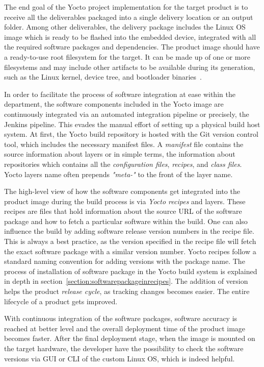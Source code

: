 The end goal of the Yocto project implementation for the target product is to receive all the deliverables packaged into a single delivery location or an output folder. Among other deliverables, the delivery package  includes the Linux \ac{OS} image which is ready to be flashed into the embedded device, integrated with all the required software packages and dependencies. The product image should have a ready-to-use root filesystem for the target. It can be made up of one or more filesystems and may include other artifacts to be available during its generation, such as the Linux kernel, device tree, and bootloader binaries~\parencite{salvador2014embedded}. 

In order to facilitate the process of software integration at ease within the department, the software components included in the Yocto image are continuously integrated via an automated integration pipeline or precisely, the Jenkins pipeline. This evades the manual effort of setting up a physical build host system. At first, the Yocto build repository is hosted with the Git version control tool, which includes the necessary manifest files. A \emph{manifest} file contains the source information about layers or in simple terms, the information about repositories which contains all the \emph{configuration files}, \emph{recipes}, and \emph{class files}. Yocto layers name often prepends \emph{"meta-"} to the front of the layer name.

The high-level view of how the software components get integrated into the product image during the build process is via \emph{Yocto recipes} and layers. These recipes are files that hold information about the source \ac{URL} of the software package and how to fetch a particular software within the build. One can also influence the build by adding software release version numbers in the recipe file. This is always a best practice, as the version specified in the recipe file will fetch the exact software package with a similar version number. Yocto recipes follow a standard naming convention for adding versions with the package name. The process of installation of software package in the Yocto build system is explained in depth in section~\ref{section:softwarepackageinrecipes}. The addition of version helps the product \emph{release cycle}, as tracking changes becomes easier. The entire  lifecycle of a product gets improved. 


With continuous integration of the software packages, software accuracy is reached at better level and the overall deployment time of the product image becomes faster. After the final deployment stage, when the image is mounted on the target hardware, the developer have the possibility to check the software versions via \ac{GUI} or \ac{CLI} of the custom Linux \ac{OS}, which is indeed helpful.

